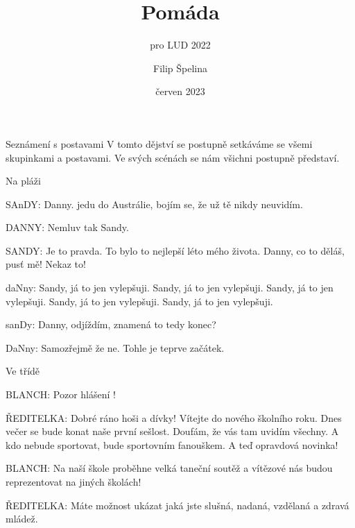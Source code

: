 ﻿\load[makra]
\load[mriezka]

\beginscenar

\title{Pomáda}
\subtitle{pro LUD 2022}
\author{Filip Špelina}
\date{červen 2023}

\titlepage

\characterpage

\contentpage


\act Seznámení s postavami
V tomto dějství se postupně setkáváme se všemi skupinkami a postavami. Ve svých scénách se nám všichni postupně představí.

\scene Na pláži

\rep SAnDY: Danny. jedu do Austrálie, bojím se, že už tě nikdy neuvidím. 

\rep DANNY: Nemluv tak Sandy.   

\rep SANDY: Je to pravda. To bylo to nejlepší léto mého života.  Danny, co to děláš, pusť mě! Nekaz to!

\rep daNny: Sandy, já to jen vylepšuji. Sandy, já to jen vylepšuji. Sandy, já to jen vylepšuji. Sandy, já to jen vylepšuji. Sandy, já to jen vylepšuji. 

\rep sanDy: Danny, odjíždím, znamená to tedy konec?

\rep DaNny: Samozřejmě že ne. Tohle je teprve začátek. 

\scene Ve třídě 

\rep BLANCH:            Pozor hlášení ! 

\rep ŘEDITELKA:                  Dobré ráno hoši a dívky! Vítejte do nového školního roku.
    Dnes večer se bude konat naše první sešlost. Doufám, že vás tam  uvidím všechny. A kdo nebude sportovat, bude sportovním fanouškem. A  teď opravdová novinka!  

\rep BLANCH:             Na naší škole proběhne velká taneční soutěž  a vítězové nás budou reprezentovat na jiných školách!

\rep ŘEDITELKA:         Máte možnost ukázat jaká jste slušná, nadaná, vzdělaná a zdravá mládež.       


\scene

